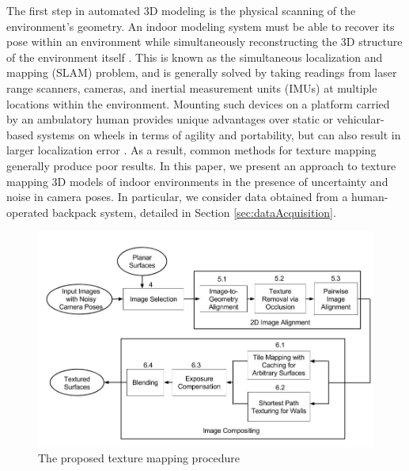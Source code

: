 \documentclass[]{spie}  %
\begin{document}
The first step in automated 3D modeling is the physical scanning of
the environment's geometry. An indoor modeling system must be able to
recover its pose within an environment while simultaneously
reconstructing the 3D structure of the environment itself
\cite{chen2010indoor, hz, kua2012loopclosure, liu2010indoor}. This is
known as the simultaneous localization and mapping (SLAM) problem, and
is generally solved by taking readings from laser range scanners,
cameras, and inertial measurement units (IMUs) at multiple locations
within the environment. Mounting such devices on a platform carried by
an ambulatory human provides unique advantages over static or
vehicular-based systems on wheels in terms of agility and portability,
but can also result in larger localization error
\cite{liu2010indoor}. As a result, common methods for texture mapping
generally produce poor results. In this paper, we present an approach
to texture mapping 3D models of indoor environments in the presence of
uncertainty and noise in camera poses. In particular, we consider data
obtained from a human-operated backpack system, detailed in Section
\ref{sec:dataAcquisition}.


\begin{figure}
  \centering
  \includegraphics[width=6in]{flowchart.jpg}
  \caption{The proposed texture mapping procedure\\}
  \label{fig:flowchart}
\end{figure}
\end{document}
